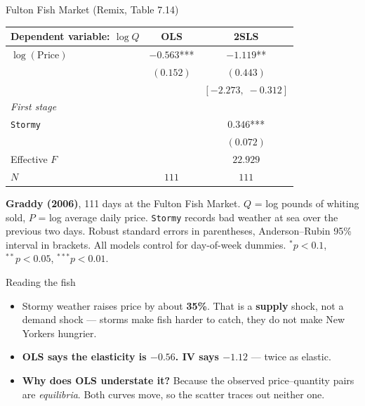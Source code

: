 \documentclass[
  11pt,
  ignorenonframetext,
  aspectratio=169,
]{beamer}
\providecommand{\tightlist}{%
  \setlength{\itemsep}{0pt}\setlength{\parskip}{0pt}}
\begin{document}
\begin{frame}[fragile]{Fulton Fish Market (Remix, Table 7.14)}
\protect{}\label{fulton-fish-market-remix-table-7.14}
\begin{center}\small
\begin{tabular}{lcc}
\toprule
Dependent variable: $\log Q$ & OLS & 2SLS \\
\midrule
$\log(\text{Price})$ & $-0.563$*** & $-1.119$** \\
 & $(0.152)$ & $(0.443)$ \\
 & & $[-2.273,\; -0.312]$ \\
\midrule
\multicolumn{3}{l}{\emph{First stage}} \\
\texttt{Stormy} & & $0.346$*** \\
 & & $(0.072)$ \\
Effective $F$ & & $22.929$ \\
\midrule
$N$ & $111$ & $111$ \\
\bottomrule
\end{tabular}
\end{center}

\vspace{-0.4em}
\footnotesize

\textbf{Graddy (2006)}, 111 days at the Fulton Fish Market. \(Q\) = log
pounds of whiting sold, \(P\) = log average daily price. \texttt{Stormy}
records bad weather at sea over the previous two days. Robust standard
errors in parentheses, Anderson--Rubin 95\% interval in brackets. All
models control for day-of-week dummies. \(^{*}p<0.1\), \(^{**}p<0.05\),
\(^{***}p<0.01\).

\normalsize
\end{frame}

\begin{frame}{Reading the fish}
\protect{}\label{reading-the-fish}
\begin{itemize}
\tightlist
\item
  Stormy weather raises price by about \textbf{35\%}. That is a
  \textbf{supply} shock, not a demand shock --- storms make fish harder
  to catch, they do not make New Yorkers hungrier.
\item
  \textbf{OLS says the elasticity is \(-0.56\). IV says \(-1.12\)} ---
  twice as elastic.
\end{itemize}

\vspace{0.4em}

\begin{itemize}
\tightlist
\item
  \textbf{Why does OLS understate it?} Because the observed
  price--quantity pairs are \emph{equilibria}. Both curves move, so the
  scatter traces out neither one.
\end{itemize}
\end{frame}
\end{document}
